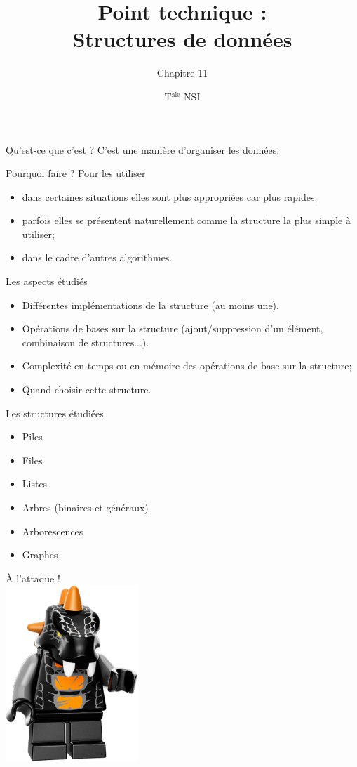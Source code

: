 \documentclass[10pt]{beamer}
\title{Point technique : \\ Structures de données}
\subtitle{Chapitre 11}
\author{T$^{\text{ale}}$ NSI}
\begin{document}
\maketitle

\begin{frame}{Qu'est-ce que c'est ?}
	C'est une manière d'organiser les données.
\end{frame}

\begin{frame}{Pourquoi faire ?}
	Pour les utiliser 
	\begin{itemize}
		\item 	dans certaines situations elles sont plus appropriées car plus rapides;
		\item 	parfois elles se présentent naturellement comme la structure la plus simple à utiliser;
		\item 	dans le cadre d'autres algorithmes.
	\end{itemize}
\end{frame}

\begin{frame}{Les aspects étudiés}
	\begin{itemize}
		\item 	Différentes implémentations de la structure (au moins une).
		\item 	Opérations de bases sur la structure (ajout/suppression d'un élément, combinaison de structures...).
		\item 	Complexité en temps ou en mémoire des opérations de base sur la structure;
		\item 	Quand choisir cette structure.
	\end{itemize}
\end{frame}

\begin{frame}{Les structures étudiées}
	\begin{itemize}
	\item 	Piles
	\item 	Files
	\item 	Listes
	\item 	Arbres (binaires et généraux)
	\item 	Arborescences
	\item 	Graphes	
\end{itemize}
\end{frame}
\begin{frame}
	\begin{center}
		\Huge À l'attaque !\\
		\includegraphics[width=5cm]{img/bytar}	
	\end{center}
\end{frame}
\end{document}
